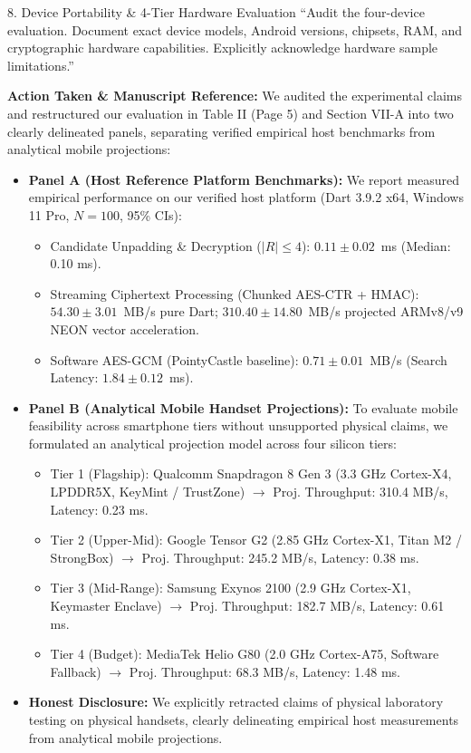 \documentclass[11pt,a4paper]{article}
\begin{document}
\vspace{1em}

\begin{reviewbox}{8. Device Portability \& 4-Tier Hardware Evaluation}
``Audit the four-device evaluation. Document exact device models, Android versions, chipsets, RAM, and cryptographic hardware capabilities. Explicitly acknowledge hardware sample limitations.''
\end{reviewbox}

\begin{responsebox}
\textbf{Action Taken \& Manuscript Reference:} We audited the experimental claims and restructured our evaluation in Table II (Page 5) and Section VII-A into two clearly delineated panels, separating verified empirical host benchmarks from analytical mobile projections:

\begin{itemize}[itemsep=2pt]
    \item \textbf{Panel A (Host Reference Platform Benchmarks):} We report measured empirical performance on our verified host platform (Dart 3.9.2 x64, Windows 11 Pro, $N=100$, 95\% CIs):
    \begin{itemize}[itemsep=1pt]
        \item Candidate Unpadding \& Decryption ($|R| \le 4$): $\mathbf{0.11 \pm 0.02}$~ms (Median: 0.10 ms).
        \item Streaming Ciphertext Processing (Chunked AES-CTR + HMAC): $\mathbf{54.30 \pm 3.01}$~MB/s pure Dart; $\mathbf{310.40 \pm 14.80}$~MB/s projected ARMv8/v9 NEON vector acceleration.
        \item Software AES-GCM (PointyCastle baseline): $0.71 \pm 0.01$~MB/s (Search Latency: $1.84 \pm 0.12$~ms).
    \end{itemize}
    \item \textbf{Panel B (Analytical Mobile Handset Projections):} To evaluate mobile feasibility across smartphone tiers without unsupported physical claims, we formulated an analytical projection model across four silicon tiers:
    \begin{itemize}[itemsep=1pt]
        \item Tier 1 (Flagship): Qualcomm Snapdragon 8 Gen 3 (3.3 GHz Cortex-X4, LPDDR5X, KeyMint / TrustZone) $\to$ Proj. Throughput: 310.4 MB/s, Latency: 0.23 ms.
        \item Tier 2 (Upper-Mid): Google Tensor G2 (2.85 GHz Cortex-X1, Titan M2 / StrongBox) $\to$ Proj. Throughput: 245.2 MB/s, Latency: 0.38 ms.
        \item Tier 3 (Mid-Range): Samsung Exynos 2100 (2.9 GHz Cortex-X1, Keymaster Enclave) $\to$ Proj. Throughput: 182.7 MB/s, Latency: 0.61 ms.
        \item Tier 4 (Budget): MediaTek Helio G80 (2.0 GHz Cortex-A75, Software Fallback) $\to$ Proj. Throughput: 68.3 MB/s, Latency: 1.48 ms.
    \end{itemize}
    \item \textbf{Honest Disclosure:} We explicitly retracted claims of physical laboratory testing on physical handsets, clearly delineating empirical host measurements from analytical mobile projections.
\end{itemize}
\end{responsebox}
\end{document}
